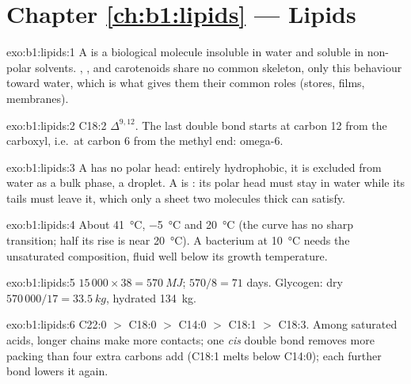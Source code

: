 \section*{Chapter \ref{ch:b1:lipids} --- Lipids}

\begin{solution}{exo:b1:lipids:1}
A  is a biological molecule insoluble in water and soluble in
non-polar solvents. , ,  and carotenoids share
no common skeleton, only this behaviour toward water, which is what
gives them their common roles (stores, films, membranes).
\end{solution}

\begin{solution}{exo:b1:lipids:2}
C18:2 $\Delta^{9,12}$. The last double bond starts at carbon 12 from
the carboxyl, i.e.\ at carbon 6 from the methyl end: omega-6.
\end{solution}

\begin{solution}{exo:b1:lipids:3}
A  has no polar head: entirely hydrophobic, it is
excluded from water as a bulk phase, a droplet. A  is
: its polar head must stay in water while its tails must
leave it, which only a sheet two molecules thick can satisfy.
\end{solution}

\begin{solution}{exo:b1:lipids:4}
About \qty{41}{\celsius}, \qty{-5}{\celsius} and \qty{20}{\celsius}
(the  curve has no sharp transition; half its rise is near
\qty{20}{\celsius}). A bacterium at \qty{10}{\celsius} needs the
unsaturated composition, fluid well below its growth temperature.
\end{solution}

\begin{solution}{exo:b1:lipids:5}
$15\,000\times 38 = \qty{570}{MJ}$; $570/8 = 71$ days. Glycogen: dry
$570\,000/17 = \qty{33.5}{kg}$, hydrated \qty{134}{kg}.
\end{solution}

\begin{solution}{exo:b1:lipids:6}
C22:0 $>$ C18:0 $>$ C14:0 $>$ C18:1 $>$ C18:3. Among saturated acids,
longer chains make more  contacts; one \emph{cis} double
bond removes more packing than four extra carbons add (C18:1 melts
below C14:0); each further bond lowers it again.
\end{solution}

